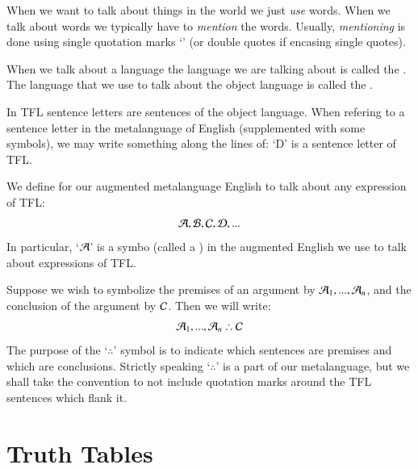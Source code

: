 \documentclass[12pt, a4paper, oneside, openright, titlepage]{book}
\begin{document}
\begin{rmk}
    When we want to talk about things in the world we just \emph{use} words. When we talk about words we typically have to \emph{mention} the words. Usually, \emph{mentioning} is done using single quotation marks `' (or double quotes if encasing single quotes).
\end{rmk}


\begin{defn}
    When we talk about a language the language we are talking about is called the . The language that we use to talk about the object language is called the .
\end{defn}

\begin{rmk}
    In TFL sentence letters are sentences of the object language. When refering to a sentence letter in the metalanguage of English (supplemented with some symbols), we may write something along the lines of: `D' is a sentence letter of TFL.
\end{rmk}


\begin{defn}
    We define  for our augmented metalanguage English to talk about any expression of TFL: \begin{equation}
        \mathcal{A},\mathcal{B},\mathcal{C},\mathcal{D},...
    \end{equation}
    In particular, `$\mathcal{A}$' is a symbo (called a ) in the augmented English we use to talk about expressions of TFL.
\end{defn}

\begin{defn}
    Suppose we wish to symbolize the premises of an argument by $\mathcal{A}_1,...,\mathcal{A}_n$, and the conclusion of the argument by $\mathcal{C}$. Then we will write:\begin{equation}
        \metav{A}_1,...,\metav{A}_n \therefore \metav{C}
    \end{equation}
    The purpose of the `$\therefore$' symbol is to indicate which sentences are premises and which are conclusions. Strictly speaking `$\therefore$' is a part of our metalanguage, but we shall take the convention to not include quotation marks around the TFL sentences which flank it.
\end{defn}





\chapter{\textsection\textsection Truth Tables}
\end{document}

